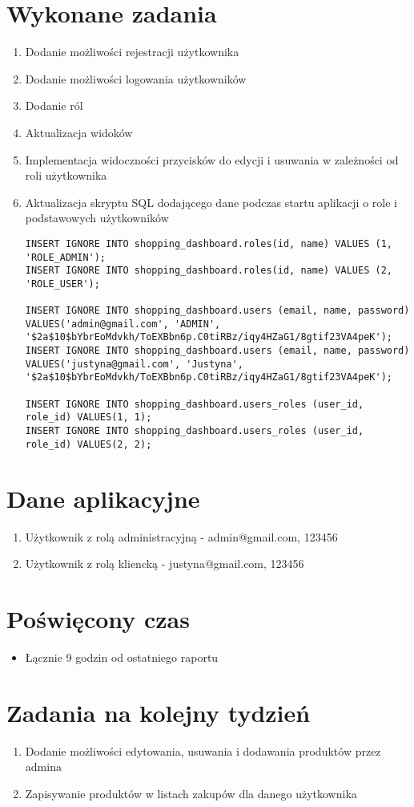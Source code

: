 \documentclass[12pt]{article}
\begin{document}
	\section{Wykonane zadania}
	\begin{enumerate}
		\item Dodanie możliwości rejestracji użytkownika
		\item Dodanie możliwości logowania użytkowników
		\item Dodanie ról
		\item Aktualizacja widoków
		\item Implementacja widoczności przycisków do edycji i usuwania w zależności od roli użytkownika
		\item Aktualizacja skryptu SQL dodającego dane podczas startu aplikacji o role i podstawowych użytkowników 
		\begin{lstlisting}[style=sqlStyle, caption=data.sql, label=lst:sqlCode]
INSERT IGNORE INTO shopping_dashboard.roles(id, name) VALUES (1, 'ROLE_ADMIN');
INSERT IGNORE INTO shopping_dashboard.roles(id, name) VALUES (2, 'ROLE_USER');

INSERT IGNORE INTO shopping_dashboard.users (email, name, password) VALUES('admin@gmail.com', 'ADMIN', '$2a$10$bYbrEoMdvkh/ToEXBbn6p.C0tiRBz/iqy4HZaG1/8gtif23VA4peK');
INSERT IGNORE INTO shopping_dashboard.users (email, name, password) VALUES('justyna@gmail.com', 'Justyna', '$2a$10$bYbrEoMdvkh/ToEXBbn6p.C0tiRBz/iqy4HZaG1/8gtif23VA4peK');

INSERT IGNORE INTO shopping_dashboard.users_roles (user_id, role_id) VALUES(1, 1);
INSERT IGNORE INTO shopping_dashboard.users_roles (user_id, role_id) VALUES(2, 2);
		\end{lstlisting}

		
	\end{enumerate}
\section{Dane aplikacyjne}
\begin{enumerate}
	\item Użytkownik z rolą administracyjną - admin@gmail.com, 123456
	\item Użytkownik z rolą kliencką - justyna@gmail.com, 123456
\end{enumerate}
	\section{Poświęcony czas}
	\begin{itemize}
		\item Łącznie 9 godzin od ostatniego raportu
	\end{itemize}
	\section{Zadania na kolejny tydzień}
	\begin{enumerate}
		\item Dodanie możliwości edytowania, usuwania i dodawania produktów przez admina
		\item Zapisywanie produktów w listach zakupów dla danego użytkownika
	\end{enumerate}
\end{document}
